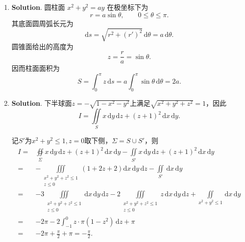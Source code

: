 \documentclass[../Main.tex]{subfiles}
\begin{document}
\begin{enumerate}
  \item \textbf{Solution}. 圆柱面 \(x^2+y^2=ay\) 在极坐标下为
        \[
          r=a\sin\theta,\qquad 0\le \theta\le \pi.
        \]
        其底面圆周弧长元为
        \[
          \mathrm{d}s=\sqrt{r^2+(r')^2}\,\mathrm{d}\theta=a\,\mathrm{d}\theta.
        \]
        圆锥面给出的高度为
        \[
          z=\frac{r}{a}=\sin\theta.
        \]
        因而柱面面积为
        \[
          S=\int_0^\pi z\,\mathrm{d}s
          =a\int_0^\pi\sin\theta\,\mathrm{d}\theta
          =2a.
        \]

  \item \textbf{Solution}. 下半球面$z=-\sqrt{1-x^2-y^2}$上满足$\sqrt{x^2+y^2+z^2}=1$，因此
        \[
          I=\iint\limits_S x\,\mathrm{d}y\,\mathrm{d}z+(z+1)^2\,\mathrm{d}x\,\mathrm{d}y.
        \]

        记$S'$为$x^2+y^2\leq 1,z=0$取下侧，$\Sigma = S\cup S'$，则
        \[
          \begin{aligned}
            I= & \oiint\limits_{\Sigma}x\,\mathrm{d}y\,\mathrm{d}z+(z+1)^2\,\mathrm{d}x\,\mathrm{d}y-\iint\limits_{S'}x\,\mathrm{d}y\,\mathrm{d}z+(z+1)^2\,\mathrm{d}x\,\mathrm{d}y                                                                                 \\
            =  & -\iiint\limits_{\substack{x^2+y^2+z^2\leq 1\\z\leq0}}(1+2z+2) \mathrm{d}x\,\mathrm{d}y\,\mathrm{d}z-\iint\limits_{S'}\,\mathrm{d}x\,\mathrm{d}y                                                                                                    \\
            =  & -3\iiint\limits_{\substack{x^2+y^2+z^2\leq 1\\z\leq0}} \mathrm{d}x\,\mathrm{d}y\,\mathrm{d}z-2\iiint\limits_{\substack{x^2+y^2+z^2\leq 1\\z\leq0}} z\,\mathrm{d}x\,\mathrm{d}y\,\mathrm{d}z+\iint\limits_{x^2+y^2\leq 1}\,\mathrm{d}x\,\mathrm{d}y \\
            =  & -2\pi-2\int_{-1}^{0} z\cdot \pi(1-z^2)\,\mathrm{d}z+\pi                                                                                                                                                                                            \\
            =  & -2\pi+\frac{\pi}{2}+\pi=-\frac{\pi}{2}.
          \end{aligned}
        \]


\end{enumerate}
\end{document}
